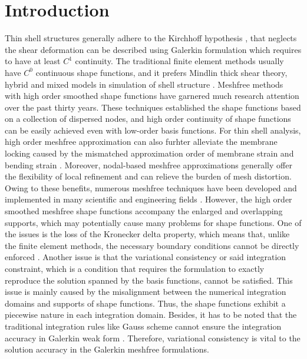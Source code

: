 \section{Introduction}\label{introduction}
Thin shell structures generally adhere to the Kirchhoff hypothesis \cite{donnell1976}, that neglects the shear deformation can be described using Galerkin formulation which requires to have at least $C^1$ continuity. 
The traditional finite element methods usually have $C^0$ continuous shape functions, and it prefers Mindlin thick shear theory, hybrid and mixed models in simulation of shell structure  \cite{hughes2000}. Meshfree methods \cite{belytschko1994,liu1995,chen2017} with high order smoothed shape functions have garnered much research attention over the past thirty years. These techniques established the shape functions based on a collection of dispersed nodes, and high order continuity of shape functions can be easily achieved even with low-order basis functions. For thin shell analysis, high order meshfree approximation can also furhter alleviate the membrane locking caused by the mismatched approximation order of membrane strain and bending strain \cite{krysl1996}. Moreover, nodal-based meshfree approximations generally offer the flexibility of local refinement and can relieve the burden of mesh distortion. Owing to these benefits, numerous meshfree techniques have been developed and implemented in many scientific and engineering fields \cite{liu2009,zhang2000,millan2011,wang2023b,suchde2022,deng2023a,wang2024}. However, the high order smoothed meshfree shape functions accompany the enlarged and overlapping supports, which may potentially cause many problems for shape functions. One of the issues is the loss of the Kronecker delta property, which means that, unlike the finite element methods, the necessary boundary conditions cannot be directly enforced  \cite{fernandez-mendez2004}. Another issue is that the variational consistency or said integration constraint, which is a condition that requires the formulation to exactly reproduce the solution spanned by the basis functions, cannot be satisfied. This issue is mainly caused by the misalignment between the numerical integration domains and supports of shape functions. Thus, the shape functions exhibit a piecewise nature in each integration domain. Besides, it has to be noted that the traditional integration rules like Gauss scheme cannot ensure the integration accuracy in Galerkin weak form \cite{li2016, wu2021}. Therefore, variational consistency is vital to the solution accuracy in the Galerkin meshfree formulations.


